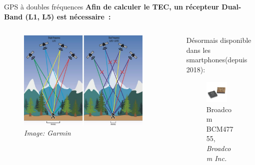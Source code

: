 \documentclass[xcolor=dvipsnames,envcountsect]{beamer}
\begin{document}
\begin{frame}{GPS à doubles fréquences}
	\justifying
	\textbf{Afin de calculer le TEC, un récepteur Dual-Band (L1, L5) est nécessaire :}
	\newline
	\begin{columns}
		\begin{column}{0.5\textwidth}
			\begin{figure}
				\includegraphics[width=0.9\textwidth]{./Figures/dual_band.jpg}
				\caption{\textit{Image: Garmin}}
			\end{figure}
		\end{column}
		\begin{column}{0.5\textwidth}
			Désormais disponible dans les smartphones(depuis 2018):
			\begin{figure}
				\includegraphics[width=0.7\textwidth]{./Figures/BCM47755.jpg}
				\caption{Broadcom BCM47755, \textit{Broadcom Inc.}}
			\end{figure}
		\end{column}
	\end{columns}
\end{frame}
\end{document}
